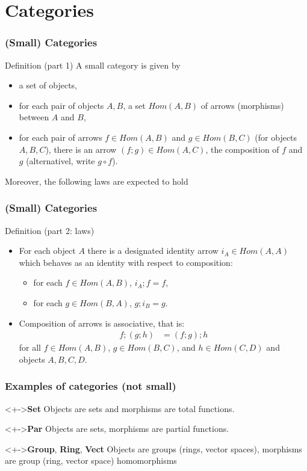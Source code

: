 \documentclass{beamer}
\begin{document}
\section{Categories}
\begin{frame}
  \frametitle{(Small) Categories}
  \begin{block}{Definition (part 1)}
    A \alert{small category} is given by
    \begin{itemize}
    \item a set of \alert{objects},
    \item for each pair of objects $A,B$, a set $Hom(A,B)$ of
      \alert{arrows} (morphisms) between $A$ and $B$,
    \item for each pair of arrows $f \in Hom(A,B)$ and $g \in Hom (B,
      C)$ (for objects $A,B,C$), there is an arrow $(f;g) \in Hom (A,
      C)$, the \alert{composition} of $f$ and $g$ (alternativel, write
      $g\circ f$).
    \end{itemize}
    Moreover, the following laws are expected to hold
  \end{block}
\end{frame}
\begin{frame}
  \frametitle{(Small) Categories}
  \begin{block}{Definition (part 2: laws)}
    \begin{itemize}
    \item For each object $A$ there is a designated
      \alert{identity arrow} $i_A \in Hom (A,A) $ which behaves as an
      identity with respect to composition:
      \begin{itemize}
      \item for each $f \in Hom (A, B)$, $i_A;f = f$,
      \item for each $g \in Hom (B, A)$, $g; i_B = g$.
      \end{itemize}
    \item Composition of arrows is associative, that is:
      \begin{align*}
        f; (g; h) &= (f; g); h
      \end{align*}
      for all $f \in Hom (A, B)$, $g \in Hom (B, C)$, and $h \in Hom
      (C, D)$ and objects $A,B,C,D$.
    \end{itemize}
  \end{block}
\end{frame}
\begin{frame}
  \frametitle{Examples of categories (not small)}
  \begin{block}<+->{\textbf{Set}}
    Objects are sets and morphisms are total functions. 
  \end{block}
  \begin{block}<+->{\textbf{Par}}
    Objects are sets, morphisms are partial functions.
  \end{block}
  \begin{block}<+->{\textbf{Group}, \textbf{Ring}, \textbf{Vect}}
    Objects are groups (rings, vector spaces), morphisms are group
    (ring, vector space) homomorphisms
  \end{block}
\end{frame}
\end{document}
